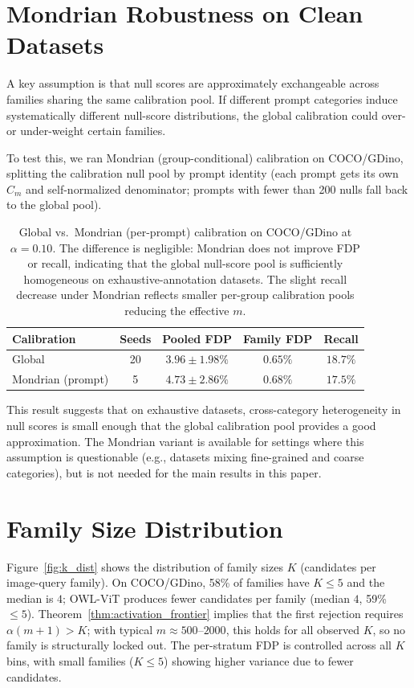 \documentclass{article}
\theoremstyle{remark}
\newcommand{\1}{\mathbf{1}}
\begin{document}
\section{Mondrian Robustness on Clean Datasets}
\label{app:mondrian_clean}

A key assumption is that null scores are approximately exchangeable across
families sharing the same calibration pool. If different prompt categories
induce systematically different null-score distributions, the global
calibration could over- or under-weight certain families.

To test this, we ran Mondrian (group-conditional) calibration on COCO/GDino,
splitting the calibration null pool by prompt identity (each prompt gets its
own $C_m$ and self-normalized denominator; prompts with fewer than 200 nulls
fall back to the global pool).

\begin{table}[h]
\centering
\small
\begin{tabular}{lcccc}
\toprule
Calibration & Seeds & Pooled FDP & Family FDP & Recall \\
\midrule
Global & 20 & $3.96 \pm 1.98\%$ & $0.65\%$ & $18.7\%$ \\
Mondrian (prompt) & 5 & $4.73 \pm 2.86\%$ & $0.68\%$ & $17.5\%$ \\
\bottomrule
\end{tabular}
\caption{Global vs.\ Mondrian (per-prompt) calibration on COCO/GDino at
$\alpha=0.10$. The difference is negligible: Mondrian does not improve FDP
or recall, indicating that the global null-score pool is sufficiently
homogeneous on exhaustive-annotation datasets. The slight recall decrease
under Mondrian reflects smaller per-group calibration pools reducing
the effective $m$.}
\label{tab:mondrian_clean}
\end{table}

This result suggests that on exhaustive datasets, cross-category heterogeneity
in null scores is small enough that the global calibration pool provides a good
approximation. The Mondrian variant is available for settings where this
assumption is questionable (e.g., datasets mixing fine-grained and coarse
categories), but is not needed for the main results in this paper.

\section{Family Size Distribution}
\label{app:family_size}

Figure~\ref{fig:k_dist} shows the distribution of family sizes $K$
(candidates per image-query family). On COCO/GDino, 58\% of families
have $K\le5$ and the median is $4$; OWL-ViT produces fewer candidates
per family (median $4$, 59\% $\le5$).
Theorem~\ref{thm:activation_frontier} implies that the first rejection
requires $\alpha(m+1)>K$; with typical $m\approx500$--$2000$, this
holds for all observed $K$, so no family is structurally locked out.
The per-stratum FDP is controlled across all $K$ bins, with small
families ($K\le5$) showing higher variance due to fewer candidates.
\end{document}

